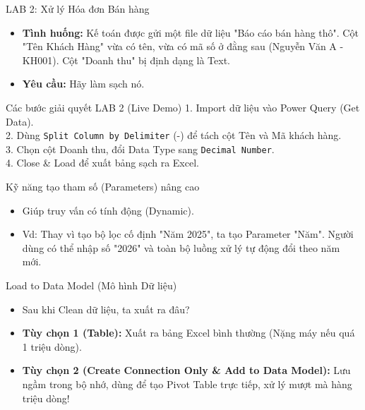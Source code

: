 \documentclass[aspectratio=169]{beamer}
\begin{document}
\begin{frame}{LAB 2: Xử lý Hóa đơn Bán hàng}
    \begin{itemize}
        \item \textbf{Tình huống:} Kế toán được gửi một file dữ liệu "Báo cáo bán hàng thô". Cột "Tên Khách Hàng" vừa có tên, vừa có mã số ở đằng sau (Nguyễn Văn A - KH001). Cột "Doanh thu" bị định dạng là Text.
        \item \textbf{Yêu cầu:} Hãy làm sạch nó.
    \end{itemize}
\end{frame}


\begin{frame}{Các bước giải quyết LAB 2 (Live Demo)}
    1. Import dữ liệu vào Power Query (Get Data).\\
    2. Dùng \texttt{Split Column by Delimiter} (-) để tách cột Tên và Mã khách hàng.\\
    3. Chọn cột Doanh thu, đổi Data Type sang \texttt{Decimal Number}.\\
    4. Close \& Load để xuất bảng sạch ra Excel.\\
\end{frame}


\begin{frame}{Kỹ năng tạo tham số (Parameters) nâng cao}
    \begin{itemize}
        \item Giúp truy vấn có tính động (Dynamic).
        \item Vd: Thay vì tạo bộ lọc cố định "Năm 2025", ta tạo Parameter "Năm". Người dùng có thể nhập số "2026" và toàn bộ luồng xử lý tự động đổi theo năm mới.
    \end{itemize}
\end{frame}


\begin{frame}{Load to Data Model (Mô hình Dữ liệu)}
    \begin{itemize}
        \item Sau khi Clean dữ liệu, ta xuất ra đâu?
        \item \textbf{Tùy chọn 1 (Table):} Xuất ra bảng Excel bình thường (Nặng máy nếu quá 1 triệu dòng).
        \item \textbf{Tùy chọn 2 (Create Connection Only \& Add to Data Model):} Lưu ngầm trong bộ nhớ, dùng để tạo Pivot Table trực tiếp, xử lý mượt mà hàng triệu dòng!
    \end{itemize}
\end{frame}
\end{document}
